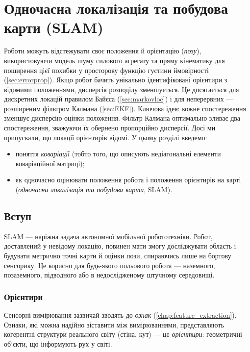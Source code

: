 \chapter{Одночасна локалізація та побудова карти (SLAM)}\label{chap:slam}
Роботи можуть відстежувати своє положення й орієнтацію (\emph{позу}), використовуючи модель шуму силового агрегату та пряму кінематику для поширення цієї похибки у просторову функцію густини ймовірності (\cref{sec:errorprop}). Якщо робот бачить унікально ідентифіковані орієнтири з відомими положеннями, дисперсія розподілу зменшується. Це досягається для дискретних локацій правилом Байєса (\cref{sec:markovloc}) і для неперервних — розширеним фільтром Калмана (\cref{sec:EKF}). Ключова ідея: кожне спостереження зменшує дисперсію оцінки положення. Фільтр Калмана оптимально зливає два спостереження, зважуючи їх обернено пропорційно дисперсії. Досі ми припускали, що локації орієнтирів відомі. У цьому розділі введемо:

\begin{itemize}
\item поняття \emph{коваріації} (тобто того, що описують недіагональні елементи коваріаційної матриці);
\item як одночасно оцінювати положення робота і положення орієнтирів на карті (\emph{одночасна локалізація та побудова карти}, SLAM).
\end{itemize}

\section{Вступ}
SLAM — наріжна задача автономної мобільної робототехніки. Робот, доставлений у невідому локацію, повинен мати змогу досліджувати область і будувати метрично точні карти й оцінки пози, спираючись лише на бортову сенсорику. Це корисно для будь-якого польового робота — наземного, позаземного, підводного або в недослідженому штучному середовищі.

\subsection{Орієнтири}
Сенсорні вимірювання зазвичай зводять до \emph{ознак} (\cref{chap:feature_extraction}). Ознаки, які можна надійно зіставити між вимірюваннями, представляють когерентні структури реального світу (стіна, кут) — це \emph{орієнтири}: геометричні об'єкти, що інформують рух у світі.

